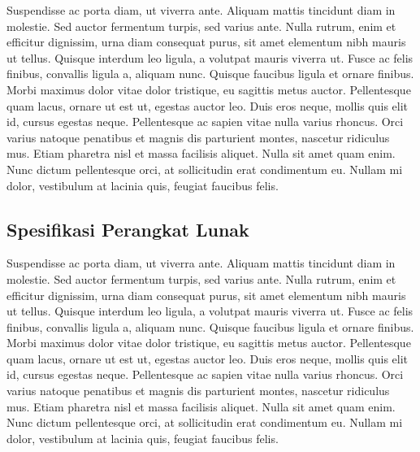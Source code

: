 Suspendisse ac porta diam, ut viverra ante. Aliquam mattis tincidunt diam in molestie. Sed auctor fermentum turpis, sed varius ante. Nulla rutrum, enim et efficitur dignissim, urna diam consequat purus, sit amet elementum nibh mauris ut tellus. Quisque interdum leo ligula, a volutpat mauris viverra ut. Fusce ac felis finibus, convallis ligula a, aliquam nunc. Quisque faucibus ligula et ornare finibus. Morbi maximus dolor vitae dolor tristique, eu sagittis metus auctor. Pellentesque quam lacus, ornare ut est ut, egestas auctor leo. Duis eros neque, mollis quis elit id, cursus egestas neque. Pellentesque ac sapien vitae nulla varius rhoncus. Orci varius natoque penatibus et magnis dis parturient montes, nascetur ridiculus mus. Etiam pharetra nisl et massa facilisis aliquet. Nulla sit amet quam enim. Nunc dictum pellentesque orci, at sollicitudin erat condimentum eu. Nullam mi dolor, vestibulum at lacinia quis, feugiat faucibus felis.\\

\subsection{Spesifikasi Perangkat Lunak}
Suspendisse ac porta diam, ut viverra ante. Aliquam mattis tincidunt diam in molestie. Sed auctor fermentum turpis, sed varius ante. Nulla rutrum, enim et efficitur dignissim, urna diam consequat purus, sit amet elementum nibh mauris ut tellus. Quisque interdum leo ligula, a volutpat mauris viverra ut. Fusce ac felis finibus, convallis ligula a, aliquam nunc. Quisque faucibus ligula et ornare finibus. Morbi maximus dolor vitae dolor tristique, eu sagittis metus auctor. Pellentesque quam lacus, ornare ut est ut, egestas auctor leo. Duis eros neque, mollis quis elit id, cursus egestas neque. Pellentesque ac sapien vitae nulla varius rhoncus. Orci varius natoque penatibus et magnis dis parturient montes, nascetur ridiculus mus. Etiam pharetra nisl et massa facilisis aliquet. Nulla sit amet quam enim. Nunc dictum pellentesque orci, at sollicitudin erat condimentum eu. Nullam mi dolor, vestibulum at lacinia quis, feugiat faucibus felis.\\

